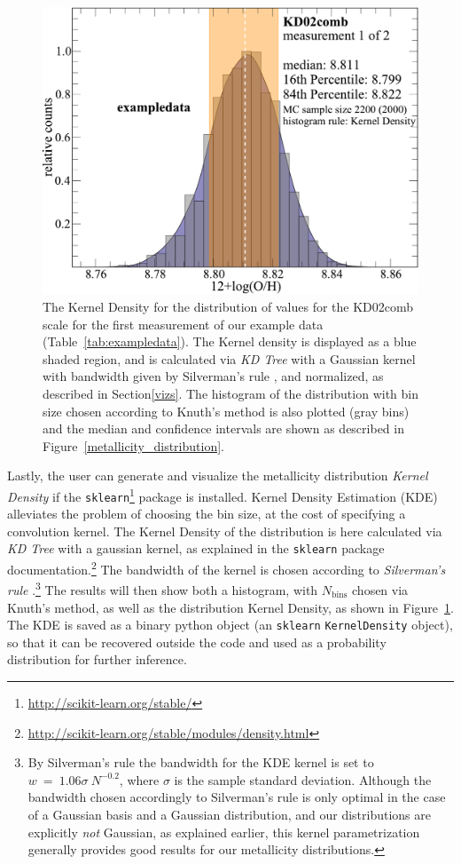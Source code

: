 \documentclass{emulateapj}
\begin{document}
\begin{figure}[ht!]
  \includegraphics[width=1.0\columnwidth]{exampledata_n2000_KD02comb_1KDE.pdf}
   \caption{The Kernel Density for the distribution of values for the KD02comb scale for the first measurement of our example data (Table~\ref{tab:exampledata}). The Kernel density is displayed as a blue shaded region, and is calculated via \emph{KD Tree} with a Gaussian kernel with bandwidth given by Silverman's rule , and normalized, as described in Section\ref{vizs}. The histogram of the distribution with bin size chosen according to Knuth's method is also plotted (gray bins) and the median and confidence intervals are shown as described in Figure~\ref{metallicity_distribution}.}\label{fig:KDE}

\end{figure}
Lastly, the user can generate and visualize the metallicity distribution \emph{Kernel Density} if the \verb=sklearn=\footnote{\url{http://scikit-learn.org/stable/}} package is installed. Kernel Density Estimation (KDE) alleviates the problem of choosing the bin size, at the cost of specifying a convolution kernel. The Kernel Density of the distribution is here calculated via \emph{KD Tree} with a gaussian kernel, as explained in the \verb=sklearn= package documentation.\footnote{\url{http://scikit-learn.org/stable/modules/density.html}} The bandwidth of the kernel is chosen according to \emph{Silverman's rule} \citep{silverman86}.\footnote{By Silverman's rule the bandwidth for the KDE kernel is set to $w~=~1.06\sigma~N^{-0.2}$, where $\sigma$ is the sample standard deviation. Although the bandwidth chosen accordingly to Silverman's rule is only optimal in the case of a Gaussian basis and a Gaussian distribution, and our distributions are explicitly \emph{not} Gaussian, as explained earlier, this kernel parametrization generally provides good results for our metallicity distributions.} The results will then show both a histogram, with $N_\mathrm{bins}$ chosen via Knuth's method, as well as the distribution Kernel Density, as shown in Figure~\ref{fig:KDE}. The KDE is saved as a binary python object (an \verb=sklearn= \verb=KernelDensity= object), so that it can be recovered outside the code and used as a probability distribution for further inference.
\end{document}
